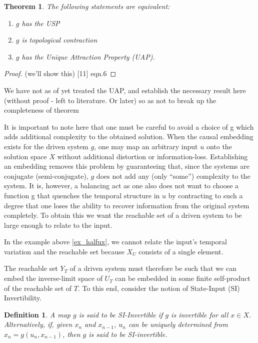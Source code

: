\documentclass[12 pt]{article}
\newtheorem{Definition}{Definition}[]
\newtheorem{Theorem}{Theorem}[]
\begin{document}
\begin{Theorem}
  The following statements are equivalent:
  \vspace{-8mm}
  \begin{enumerate}[noitemsep, label=\roman*.]
    \item $g$ has the USP 
    \item $g$ is topological contraction 
    \item $g$ has the Unique Attraction Property (UAP). 
  \end{enumerate}
\end{Theorem}
\begin{proof}
  (we’ll show this)  [11] eqn.6 
\end{proof}

We have not as of yet treated the UAP, and establish the necessary result here (without proof - left to literature. Or later) so as not to break up the completeness of theorem 

It is important to note here that one must be careful to avoid a choice of g which adds additional complexity to the obtained solution.  
When the causal embedding exists for the driven system $g$, one may map an arbitrary input $u$ onto the solution space $X$ without additional distortion or information-loss.  
Establishing an embedding removes this problem by guaranteeing that, since the systems are conjugate (semi-conjugate), $g$ does not add any (only “some”) complexity to the system.  
It is, however, a balancing act as one also does not want to choose a function g that quenches the temporal structure in $u$ by contracting to such a degree that one loses the ability to recover information from the original system completely. To obtain this we want the reachable set of a driven system to be large enough to relate to the input.  
 
In the example above \ref{ex_halfux}, we cannot relate the input's temporal variation and the reachable set because $X_U$ consists of a single element.  

The reachable set $Y_T$ of a driven system must therefore be such that we can embed the inverse-limit space of $U_T$ can be embedded in some finite self-product of the reachable set of $T$. To this end, consider the notion of State-Input (SI) Invertibility.  

\begin{Definition}
  A map $g$ is said to be SI-Invertible if $g$ is invertible for all $x\in{X}$. Alternatively, if, given $x_n$ and $x_{n-1}$, $u_n$ can be uniquely determined from $x_n=g(u_n,x_{n-1})$, then $g$ is said to be SI-invertible.
\end{Definition}
 
\end{document}
